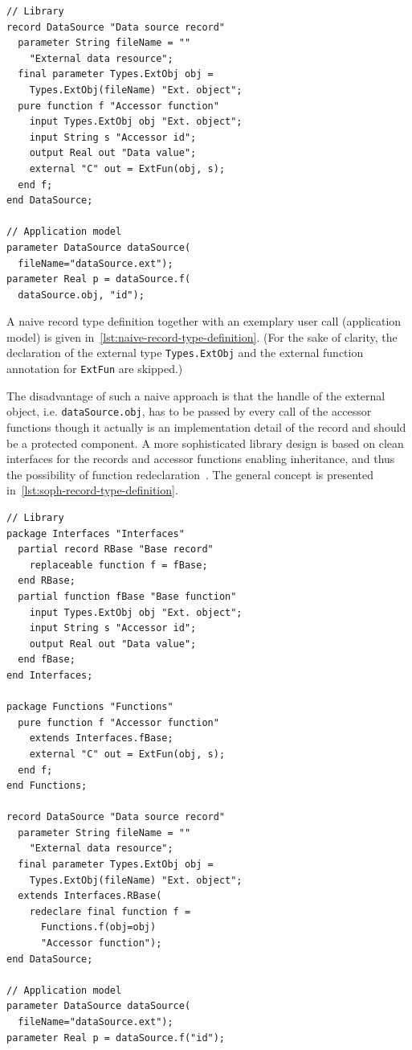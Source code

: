 \documentclass{modelica}
\newcommand{\modelica}[1]{\lstinline[language=modelica]|#1|}
\begin{document}
\begin{lstlisting}[caption=Naive record type definition, label=lst:naive-record-type-definition, language=modelica]
// Library
record DataSource "Data source record"
  parameter String fileName = ""
    "External data resource";
  final parameter Types.ExtObj obj =
    Types.ExtObj(fileName) "Ext. object";
  pure function f "Accessor function"
    input Types.ExtObj obj "Ext. object";
    input String s "Accessor id";
    output Real out "Data value";
    external "C" out = ExtFun(obj, s);
  end f;
end DataSource;

// Application model
parameter DataSource dataSource(
  fileName="dataSource.ext");
parameter Real p = dataSource.f(
  dataSource.obj, "id");
\end{lstlisting}

A naive record type definition together with an exemplary user call (application model) is given in~\autoref{lst:naive-record-type-definition}.
(For the sake of clarity, the declaration of the external type \modelica{Types.ExtObj} and the external function annotation for \modelica{ExtFun} are skipped.)

The disadvantage of such a naive approach is that the handle of the external object, i.e. \modelica{dataSource.obj}, has to be passed by every call of the accessor functions though it actually is an implementation detail of the record and should be a protected component.
A more sophisticated library design is based on clean interfaces for the records and accessor functions enabling inheritance, and thus the possibility of function redeclaration~\cite{modelisax2018hints}.
The general concept is presented in~\autoref{lst:soph-record-type-definition}.

\begin{lstlisting}[caption=Sophisticated record type definition, label=lst:soph-record-type-definition, language=modelica]
// Library
package Interfaces "Interfaces"
  partial record RBase "Base record"
    replaceable function f = fBase;
  end RBase;
  partial function fBase "Base function"
    input Types.ExtObj obj "Ext. object";
    input String s "Accessor id";
    output Real out "Data value";
  end fBase;
end Interfaces;

package Functions "Functions"
  pure function f "Accessor function"
    extends Interfaces.fBase;
    external "C" out = ExtFun(obj, s);
  end f;
end Functions;

record DataSource "Data source record"
  parameter String fileName = ""
    "External data resource";
  final parameter Types.ExtObj obj =
    Types.ExtObj(fileName) "Ext. object";
  extends Interfaces.RBase(
    redeclare final function f =
      Functions.f(obj=obj)
      "Accessor function");
end DataSource;

// Application model
parameter DataSource dataSource(
  fileName="dataSource.ext");
parameter Real p = dataSource.f("id");
\end{lstlisting}
\end{document}

